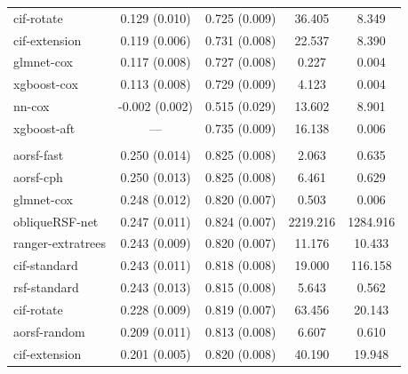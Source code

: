 \documentclass[12pt]{article}\usepackage[]{graphicx}\usepackage[]{xcolor}
\newenvironment{knitrout}{}{} %
\begin{document}
\begin{knitrout}
\begin{longtable}[t]{lcccc}
\hspace{1em}cif-rotate & 0.129 (0.010) & 0.725 (0.009) & 36.405 & 8.349\\
\hspace{1em}cif-extension & 0.119 (0.006) & 0.731 (0.008) & 22.537 & 8.390\\
\hspace{1em}glmnet-cox & 0.117 (0.008) & 0.727 (0.008) & 0.227 & 0.004\\
\hspace{1em}xgboost-cox & 0.113 (0.008) & 0.729 (0.009) & 4.123 & 0.004\\
\hspace{1em}nn-cox & -0.002 (0.002) & 0.515 (0.029) & 13.602 & 8.901\\
\hspace{1em}xgboost-aft & --- & 0.735 (0.009) & 16.138 & 0.006\\
\addlinespace[0.3em]
\multicolumn{5}{l}{\textit{\textbf{Serum free light chain; death, n = 7874, p = 10}}}\\
\hline
\hspace{1em}aorsf-fast & 0.250 (0.014) & 0.825 (0.008) & 2.063 & 0.635\\
\hspace{1em}aorsf-cph & 0.250 (0.013) & 0.825 (0.008) & 6.461 & 0.629\\
\hspace{1em}glmnet-cox & 0.248 (0.012) & 0.820 (0.007) & 0.503 & 0.006\\
\hspace{1em}obliqueRSF-net & 0.247 (0.011) & 0.824 (0.007) & 2219.216 & 1284.916\\
\hspace{1em}ranger-extratrees & 0.243 (0.009) & 0.820 (0.007) & 11.176 & 10.433\\
\hspace{1em}cif-standard & 0.243 (0.011) & 0.818 (0.008) & 19.000 & 116.158\\
\hspace{1em}rsf-standard & 0.243 (0.013) & 0.815 (0.008) & 5.643 & 0.562\\
\hspace{1em}cif-rotate & 0.228 (0.009) & 0.819 (0.007) & 63.456 & 20.143\\
\hspace{1em}aorsf-random & 0.209 (0.011) & 0.813 (0.008) & 6.607 & 0.610\\
\hspace{1em}cif-extension & 0.201 (0.005) & 0.820 (0.008) & 40.190 & 19.948\\

\end{longtable}
\end{knitrout}
\end{document}
